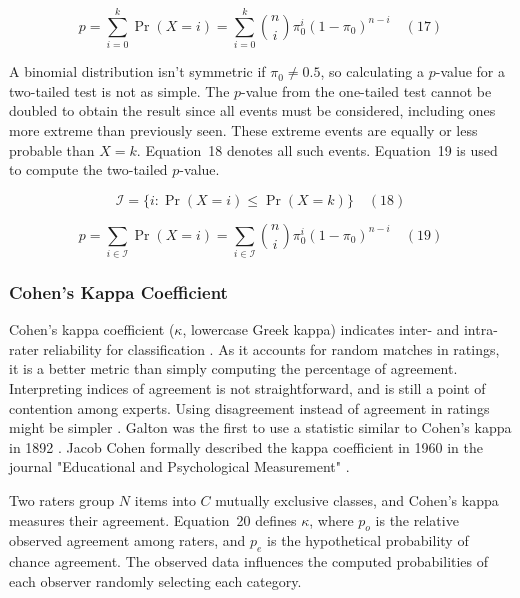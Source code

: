 \documentclass[sn-mathphys-num]{sn-jnl}%
\begin{document}
\begin{equation}
	p=\sum_{i=0}^{k}\Pr(X=i)=\sum_{i=0}^{k}{\binom{n}{i}}\pi_{0}^{i}(1-\pi_{0})^{n-i}
	\quad\left(17\right)
\end{equation}

A binomial distribution isn't symmetric if $\pi_{0}\neq 0.5$, so calculating a $p$-value for a two-tailed test is not as simple. The $p$-value from the one-tailed test cannot be doubled to obtain the result since all events must be considered, including ones more extreme than previously seen. These extreme events are equally or less probable than $X=k$. Equation~18 denotes all such events. Equation~19 is used to compute the two-tailed $p$-value.

\begin{equation}
	{\mathcal{I}}=\{i\colon \Pr(X=i)\leq \Pr(X=k)\}
	\quad\left(18\right)
\end{equation}

\begin{equation}
	p=\sum_{i\in {\mathcal{I}}}\Pr(X=i)=\sum_{i\in {\mathcal{I}}}{\binom{n}{i}}\pi_{0}^{i}(1-\pi_{0})^{n-i}
	\quad\left(19\right)
\end{equation}

\subsubsection{Cohen's Kappa Coefficient}

Cohen's kappa coefficient ($\kappa$, lowercase Greek kappa) indicates inter- and intra-rater reliability for classification \cite{mchugh2012interrater}. As it accounts for random matches in ratings, it is a better metric than simply computing the percentage of agreement. Interpreting indices of agreement is not straightforward, and is still a point of contention among experts. Using disagreement instead of agreement in ratings might be simpler \cite{pontius2011death}. Galton was the first to use a statistic similar to Cohen's kappa in 1892 \cite{galton1892finger, smeeton1985early}. Jacob Cohen formally described the kappa coefficient in 1960 in the journal "Educational and Psychological Measurement" \cite{cohen1960coefficient}.

Two raters group $N$ items into $C$ mutually exclusive classes, and Cohen's kappa measures their agreement. Equation~20 defines $\kappa$, where $p_{o}$ is the relative observed agreement among raters, and $p_{e}$ is the hypothetical probability of chance agreement. The observed data influences the computed probabilities of each observer randomly selecting each category.
\end{document}
